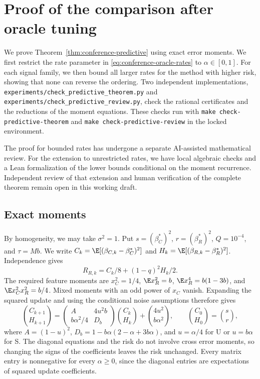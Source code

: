 \section{Proof of the comparison after oracle tuning}
\label{sec:predictive-proofs}

We prove Theorem~\ref{thm:conference-predictive} using exact error moments. We
first restrict the rate parameter in \eqref{eq:conference-oracle-rates} to
$\alpha\in[0,1]$. For each signal family, we then bound all larger rates for
the method with higher risk, showing that none can reverse the ordering. Two
independent implementations,
\texttt{experiments/check\_predictive\_theorem.py} and
\texttt{experiments/check\_predictive\_review.py}, check the rational
certificates and the reductions of the moment equations. These checks run with
\texttt{make check-predictive-theorem} and \texttt{make check-predictive-review}
in the locked environment.

The proof for bounded rates has undergone a separate AI-assisted mathematical
review. For the extension to unrestricted rates, we have local algebraic checks
and a Lean formalization of the lower bounds conditional on the moment
recurrence. Independent review of that extension and human verification of the
complete theorem remain open in this working draft.

\subsection{Exact moments}

By homogeneity, we may take $\sigma^2=1$. Put
$s=(\beta_C^*)^2$, $r=(\beta_R^*)^2$, $Q=10^{-4}$, and $\tau=Mb$.
We write $C_k=\E[(\beta_{C,k}-\beta_C^*)^2]$ and
$H_k=\E[(\beta_{R,k}-\beta_R^*)^2]$. Independence gives
\begin{equation}
 R_{R,k}=C_k/8+(1-q)^2H_k/2.
 \label{eq:predictive-risk}
\end{equation}
The required feature moments are $x_C^2=1/4$, $\E x_R^2=b$,
$\E x_R^4=b(1-3b)$, and $\E x_C^2x_R^2=b/4$. Mixed moments with an odd
power of $x_C$ vanish. Expanding the squared update and using the conditional
noise assumptions therefore gives
\begin{equation}
 \binom{C_{k+1}}{H_{k+1}}
 =\begin{pmatrix}
    A&4u^2b\\ b\alpha^2/4&D_b
   \end{pmatrix}\binom{C_k}{H_k}
   +\binom{4u^2}{b\alpha^2},\qquad
 \binom{C_0}{H_0}=\binom{s}{r},
 \label{eq:predictive-moments}
\end{equation}
where $A=(1-u)^2$, $D_b=1-b\alpha(2-\alpha+3b\alpha)$, and
$u=\alpha/4$ for U or $u=b\alpha$ for S. The diagonal equations and the risk do
not involve cross error moments, so changing the signs of the coefficients
leaves the risk unchanged. Every matrix entry is nonnegative for every
$\alpha\geq0$, since the diagonal entries are expectations of squared update
coefficients.

